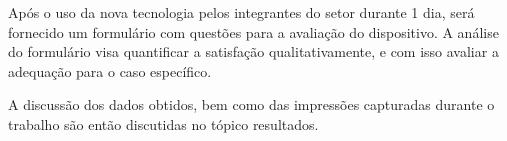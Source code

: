 Após o uso da nova tecnologia pelos integrantes do setor durante 1 dia, será fornecido um formulário com questões para a avaliação do dispositivo. A análise do formulário visa quantificar a satisfação qualitativamente, e com isso avaliar a adequação para o caso específico.

A discussão dos dados obtidos, bem como das impressões capturadas durante o trabalho são então discutidas no tópico resultados.